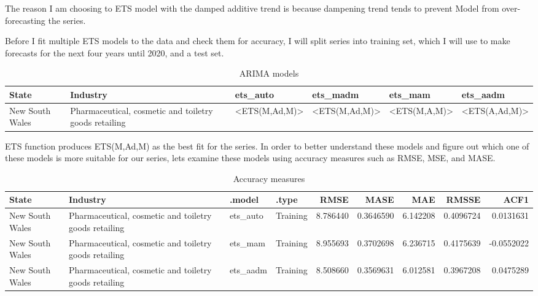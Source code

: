 \documentclass[
]{article}
\begin{document}
The reason I am choosing to ETS model with the damped additive trend is
because dampening trend tends to prevent Model from over-forecasting the
series.

Before I fit multiple ETS models to the data and check them for
accuracy, I will split series into training set, which I will use to
make forecasts for the next four years until 2020, and a test set.

\begin{table}

\caption{\label{tab:unnamed-chunk-5}ARIMA models}
\centering
\begin{tabular}[t]{l|l|l|l|l|l}
\hline
State & Industry & ets\_auto & ets\_madm & ets\_mam & ets\_aadm\\
\hline
New South Wales & Pharmaceutical, cosmetic and toiletry goods retailing & <ETS(M,Ad,M)> & <ETS(M,Ad,M)> & <ETS(M,A,M)> & <ETS(A,Ad,M)>\\
\hline
\end{tabular}
\end{table}

ETS function produces ETS(M,Ad,M) as the best fit for the series. In
order to better understand these models and figure out which one of
these models is more suitable for our series, lets examine these models
using accuracy measures such as RMSE, MSE, and MASE.

\begin{table}

\caption{\label{tab:unnamed-chunk-6}Accuracy measures}
\centering
\begin{tabular}[t]{l|l|l|l|r|r|r|r|r}
\hline
State & Industry & .model & .type & RMSE & MASE & MAE & RMSSE & ACF1\\
\hline
New South Wales & Pharmaceutical, cosmetic and toiletry goods retailing & ets\_auto & Training & 8.786440 & 0.3646590 & 6.142208 & 0.4096724 & 0.0131631\\
\hline
New South Wales & Pharmaceutical, cosmetic and toiletry goods retailing & ets\_mam & Training & 8.955693 & 0.3702698 & 6.236715 & 0.4175639 & -0.0552022\\
\hline
New South Wales & Pharmaceutical, cosmetic and toiletry goods retailing & ets\_aadm & Training & 8.508660 & 0.3569631 & 6.012581 & 0.3967208 & 0.0475289\\
\hline
\end{tabular}
\end{table}
\end{document}
